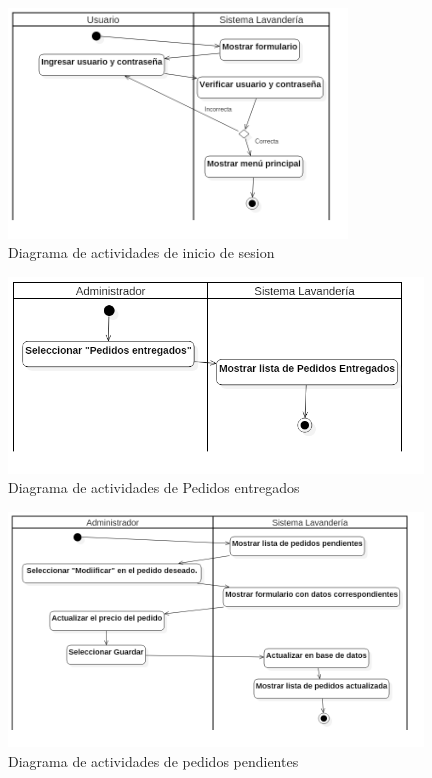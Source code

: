 \begin{figure}[htb]
\begin{center}
\includegraphics[width=9cm]{./imagenes/diagramas/Actividades_Lavanderia_InicioSesion.png}
\end{center}
\caption{Diagrama de actividades de inicio de sesion}
\end{figure}

\begin{figure}[htb]
\begin{center}
\includegraphics[width=11cm]{./imagenes/diagramas/Actividades_Lavanderia_PedidosEntregados.png}
\end{center}
\caption{Diagrama de actividades de Pedidos entregados}
\end{figure}

\newpage

\begin{figure}[htb]
\begin{center}
\includegraphics[width=11cm]{./imagenes/diagramas/Actividades_Lavanderia_PedidosPendientes.png}
\end{center}
\caption{Diagrama de actividades de pedidos pendientes}
\end{figure}


